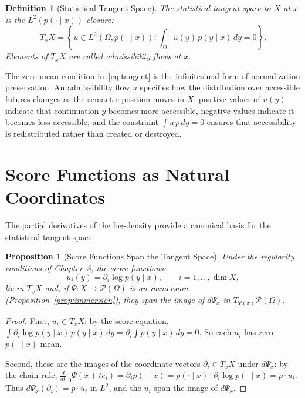 \documentclass[12pt, oneside]{book}
\theoremstyle{plain-flyxion}
\newtheorem{proposition}[theorem]{Proposition}
\theoremstyle{definition-flyxion}
\newtheorem{definition}[theorem]{Definition}
\begin{document}
\begin{definition}[Statistical Tangent Space]\label{def:tan}
The statistical tangent space to $X$ at $x$ is the $L^2(p(\cdot\mid x))$-closure:
\begin{equation}\label{eq:tangent}
T_x X = \left\{ u \in L^2(\Omega, p(\cdot\mid x)) : \int_\Omega u(y)\, p(y\mid x)\, dy = 0 \right\}.
\end{equation}
Elements of $T_x X$ are called \emph{admissibility flows} at $x$.
\end{definition}

The zero-mean condition in~\eqref{eq:tangent} is the infinitesimal form of normalization
preservation. An admissibility flow $u$ specifies how the distribution over accessible
futures changes as the semantic position moves in $X$: positive values of $u(y)$ indicate
that continuation $y$ becomes more accessible, negative values indicate it becomes less
accessible, and the constraint $\int u\, p\, dy = 0$ ensures that accessibility is
redistributed rather than created or destroyed.

\section{Score Functions as Natural Coordinates}

The partial derivatives of the log-density provide a canonical basis for the statistical
tangent space.

\begin{proposition}[Score Functions Span the Tangent Space]\label{prop:score-basis}
Under the regularity conditions of Chapter~3, the score functions:
\begin{equation}\label{eq:score}
u_i(y) = \partial_i \log p(y \mid x), \qquad i = 1, \ldots, \dim X,
\end{equation}
lie in $T_x X$ and, if $\Psi: X \to \mathcal{P}(\Omega)$ is an immersion
(Proposition~\ref{prop:immersion}), they span the image of $d\Psi_x$ in $T_{\Psi(x)}
\mathcal{P}(\Omega)$.
\end{proposition}

\begin{proof}
First, $u_i \in T_x X$: by the score equation, $\int \partial_i \log p(y\mid x)\,
p(y\mid x)\, dy = \partial_i \int p(y\mid x)\, dy = 0$. So each $u_i$ has zero
$p(\cdot\mid x)$-mean.

Second, these are the images of the coordinate vectors $\partial_i \in T_x X$ under
$d\Psi_x$: by the chain rule, $\frac{d}{dt}\big|_0 \Psi(x + t e_i) = \partial_i
p(\cdot \mid x) = p(\cdot \mid x) \cdot \partial_i \log p(\cdot \mid x) = p \cdot u_i$.
Thus $d\Psi_x(\partial_i) = p \cdot u_i$ in $L^2$, and the $u_i$ span the image of
$d\Psi_x$.
\end{proof}
\end{document}
